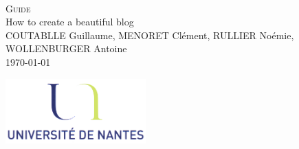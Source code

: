 \documentclass[a4paper,10pt]{article}
\begin{document}
\fancyhead[LE,CE,RE,LO,CO,RO]{}
\fancyfoot[LE,CE,RE,LO,CO,RO]{}
\renewcommand{\headrulewidth}{0.4pt}
\renewcommand{\footrulewidth}{0.4pt}

\begin{titlepage}

\vspace*{\fill}~
\begin{center}
{\large \textsc{Guide}} \\
\vspace{1cm}
{\LARGE How to create a beautiful blog} \\
\vspace{1cm}
COUTABLLE Guillaume, MENORET Clément, RULLIER Noémie, WOLLENBURGER Antoine \\
\today
\end{center}
\vspace*{\fill}

\begin{center}
\noindent 
\includegraphics[height=2.5cm]{Images/universite.png}
\end{center}
\pagebreak
\end{titlepage}

\newpage
\tableofcontents 

\newpage
\pagestyle{fancy}


\end{document}
